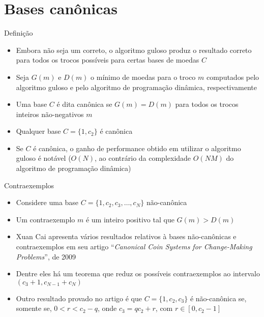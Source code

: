 \section{Bases canônicas}

\begin{frame}[fragile]{Definição}

    \begin{itemize}
        \item Embora não seja um correto, o algoritmo guloso produz o resultado correto para todos
            os trocos possíveis para certas bases de moedas $C$

        \item Seja $G(m)$ e $D(m)$ o mínimo de moedas para o troco $m$ computados pelo algoritmo 
            guloso e pelo algoritmo de programação dinâmica, respectivamente
            
        \item Uma base $C$ é dita canônica se $G(m) = D(m)$ para todos os trocos inteiros
            não-negativos $m$

        \item Qualquer base $C = \{ 1, c_2 \}$ é canônica

        \item Se $C$ é canônica, o ganho de performance obtido em utilizar o algoritmo guloso
            é notável ($O(N)$, ao contrário da complexidade $O(NM)$ do algoritmo de programação dinâmica)
    \end{itemize}

\end{frame}

\begin{frame}[fragile]{Contraexemplos}

    \begin{itemize}
        \item Considere uma base $C = \{ 1, c_2, c_3, \ldots, c_N \}$ não-canônica

        \item Um contraexemplo $m$ é um inteiro positivo tal que $G(m) > D(m)$

        \item Xuan Cai apresenta vários resultados relativos à bases não-canônicas e contraexemplos
            em seu artigo ``\textit{Canonical Coin Systems for Change-Making Problems}'', de 2009

        \item Dentre eles há um teorema que reduz os possíveis contraexemplos ao 
            intervalo $(c_3 + 1, c_{N - 1} + c_N)$

        \item Outro resultado provado no artigo é que $C = \{ 1, c_2, c_3 \}$ é não-canônica se,
            somente se, $0 < r < c_2 - q$, onde $c_3 = qc_2 + r$, com $r \in [0, c_2 - 1]$
    \end{itemize}

\end{frame}

